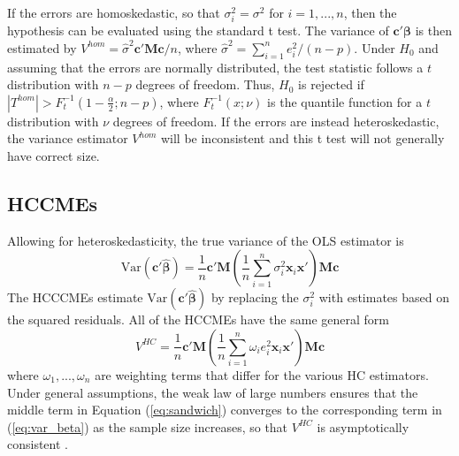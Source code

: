 \documentclass[12pt]{article}\usepackage[]{graphicx}\usepackage[]{color}
\newcommand{\Var}{\text{Var}}
\newcommand{\bm}{\mathbf}
\newcommand{\bs}{\boldsymbol}
\begin{document}
If the errors are homoskedastic, so that $\sigma_i^2 = \sigma^2$ for $i = 1,...,n$, then the hypothesis can be evaluated using the standard t test. 
The variance of $\bm{c}'\bs\beta$ is then estimated by $V^{hom} = \hat\sigma^2 \bm{c}'\bm{M}\bm{c} / n$, where $\hat\sigma^2 = \sum_{i=1}^n e_i^2 / (n - p)$. 
Under $H_0$ and assuming that the errors are normally distributed, the test statistic follows a $t$ distribution with $n - p$ degrees of freedom. 
Thus, $H_0$ is rejected if $\left|T^{hom}\right| > F_t^{-1}\left(1 - \frac{\alpha}{2}; n - p\right)$, where $F_t^{-1}(x; \nu)$ is the quantile function for a $t$ distribution with $\nu$ degrees of freedom. 
If the errors are instead heteroskedastic, the variance estimator $V^{hom}$ will be inconsistent and this t test will not generally have correct size. 

\subsection{HCCMEs}

Allowing for heteroskedasticity, the true variance of the OLS estimator is 
\begin{equation}
\label{eq:var_beta}
\Var\left(\bm{c}'\bs{\hat\beta}\right) = \frac{1}{n} \bm{c}'\bm{M} \left(\frac{1}{n}\sum_{i=1}^n \sigma_i^2 \bm{x}_i\bm{x}'\right) \bm{M}\bm{c}
\end{equation}
The HCCCMEs estimate $\Var\left(\bm{c}'\bs{\hat\beta}\right)$ by replacing the $\sigma_i^2$ with estimates based on the squared residuals. All of the HCCMEs have the same general form  
\begin{equation}
\label{eq:sandwich}
V^{HC} = \frac{1}{n} \bm{c}'\bm{M} \left(\frac{1}{n}\sum_{i=1}^n \omega_i e_i^2 \bm{x}_i\bm{x}'\right)\bm{M} \bm{c}
\end{equation}
where $\omega_{1},...,\omega_{n}$ are weighting terms that differ for the various HC estimators. 
Under general assumptions, the weak law of large numbers ensures that the middle term in Equation (\ref{eq:sandwich}) converges to the corresponding term in (\ref{eq:var_beta}) as the sample size increases, so that $V^{HC}$ is asymptotically consistent \citep{White1980heteroskedasticity}.
\end{document}
